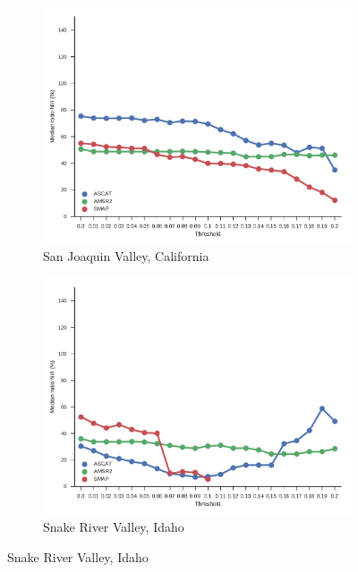 \documentclass[hess, manuscript]{copernicus}
\begin{document}
\begin{figure}
   \centering
   \begin{subfigure}[t]{0.49\textwidth}
       \centering
       \includegraphics[width=\textwidth]{figures/methods/Southern_California_precmask_True}
       \caption{San Joaquin Valley, California}
       \label{fig:sensitivity-analysis-SJV}
   \end{subfigure}
   \hfill
   \begin{subfigure}[t]{0.49\textwidth}
       \centering
       \includegraphics[width=\textwidth]{figures/methods/Idaho_precmask_True}
       \caption{Snake River Valley, Idaho}
       \label{fig:sensitivity-analysis-SRP}

\end{subfigure}
\end{figure}
\end{document}
